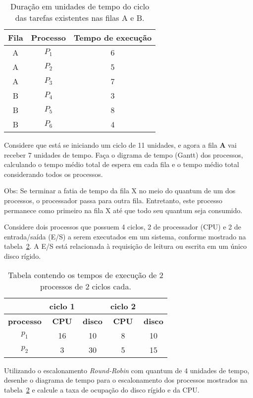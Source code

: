 \begin{table}[h]
  \centering
  \begin{tabular}{c|c|c}\hline
    \bf Fila & \bf Processo & \bf Tempo de execução \\ \hline\hline
    A & $P_1$ & 6 \\\hline
    A & $P_2$ & 5 \\\hline
    A & $P_3$ & 7 \\\hline
    B & $P_4$ & 3 \\\hline
    B & $P_5$ & 8 \\\hline
    B & $P_6$ & 4 \\\hline
  \end{tabular}
  \caption{Duração em unidades de tempo do ciclo das tarefas existentes nas filas A e B.}
  \label{so:sched}
\end{table}

\noindent Considere que está se iniciando um ciclo de 11 unidades, e
agora a fila {\bf A} vai receber 7 unidades de tempo. Faça o digrama
de tempo (Gantt) dos processos, calculando o tempo médio total de espera em
cada fila e o tempo médio total considerando todos os processos.

\noindent Obs: Se terminar a fatia de tempo da fila X no meio do 
quantum de um dos processos, o processador passa para outra
fila. Entretanto, este processo permanece como primeiro na fila X até
que todo seu quantum seja consumido.

 Considere dois processos que possuem 4 ciclos, 2 de
processador (CPU) e 2 de entrada/saída (E/S) a serem executados em um
sistema, conforme mostrado na tabela~\ref{tab:ioproc}. A E/S está
relacionada à requisição de leitura ou escrita em um único disco
rígido.

\begin{table}[h]
  \centering
  \begin{tabular}{c|cc|cc}\hline
    & ciclo 1 & & ciclo 2 &  \\\hline
    \bf processo & \bf CPU & \bf disco & \bf CPU & \bf disco \\\hline
    $p_1$ & 16 & 10 & 8 & 10  \\
    $p_2$ & 3 & 30 & 5 & 15 \\\hline
  \end{tabular}
  \caption{Tabela contendo os tempos de execução de 2 processos de 2
    ciclos cada.}
  \label{tab:ioproc}
\end{table}

Utilizando o escalonamento {\em Round-Robin} com quantum de 4 unidades
de tempo, desenhe o diagrama de tempo para o escalonamento dos
processos mostrados na tabela~\ref{tab:ioproc} e calcule a taxa de
ocupação do disco rígido e da CPU.



